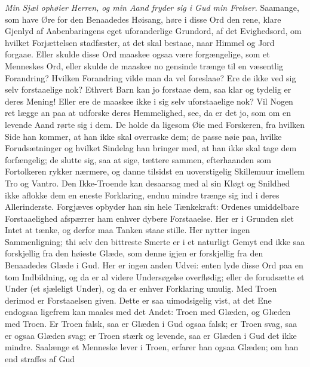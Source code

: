 \documentclass[12pt,a4paper]{book}
\begin{document}
\emph{Min Sjæl ophøier Herren, og min Aand fryder sig i Gud min Frelser.}
Saamange, som have Øre for den Benaadedes Høisang, høre i disse Ord den rene,
klare Gjenlyd af Aabenbaringens eget uforanderlige Grundord, af det Evighedsord,
om hvilket Forjættelsen stadfæster, at det skal bestaae, naar Himmel og Jord
forgaae. Eller skulde disse Ord maaskee ogsaa være forgængelige, som et Menneskes
Ord, eller skulde de maaskee no\-%
gensinde trænge til en væsentlig Forandring? Hvilken Forandring vilde man da vel
foreslaae? Ere de ikke ved sig selv forstaaelige nok? Ethvert Barn kan jo forstaae
dem, saa klar og tydelig er deres Mening! Eller ere de maaskee ikke i sig selv
uforstaaelige nok? Vil Nogen ret lægge an paa at udforske deres Hemmelighed, see,
da er det jo, som om en levende Aand rørte sig i dem. De holde da ligesom Øie med
Forskeren, fra hvilken Side han kommer, at han ikke skal overraske dem; de passe
nøie paa, hvilke Forudsætninger og hvilket Sindelag han bringer med, at han ikke
skal tage dem forfængelig; de slutte sig, saa at sige, tættere sammen,
efterhaanden som Fortolkeren rykker nærmere, og danne tilsidst en uoverstigelig
Skillemuur imellem Tro og Vantro. Den Ikke-Troende kan desaarsag med al sin Kløgt
og Snildhed ikke aflokke dem en eneste Forklaring, endnu mindre trænge sig ind i
deres Allerinderste. Forgjæves opbyder han sin hele Tænkekraft: Ordenes
umiddelbare Forstaaelighed afspærrer ham enhver dybere Forstaaelse. Her er i
Grunden slet Intet at tænke, og derfor maa Tanken staae stille. Her nytter ingen
Sammenligning; thi selv den bittreste Smerte er i et naturligt Gemyt end ikke saa
forskjellig fra den høieste Glæde, som denne igjen er forskjellig fra den
Benaadedes Glæde i Gud. Her er ingen anden Udvei: enten lyde disse Ord paa en tom
Indbildning, og da er al videre Undersøgelse overflødig; eller de forudsætte et
Under (et sjæleligt Under), og da er enhver Forklaring umulig. Med Troen derimod
er Forstaaelsen given. Dette er saa uimodsigelig vist, at det Ene endogsaa
ligefrem kan maales med det Andet: Troen med Glæden, og Glæden med Troen. Er Troen
falsk, saa er Glæden i Gud ogsaa falsk; er Troen svag, saa er ogsaa Glæden svag;
er Troen stærk og levende, saa er Glæden i Gud det ikke mindre. Saalænge et
Menneske lever i Troen, erfarer han ogsaa Glæden; om han end straffes af Gud
\end{document}
